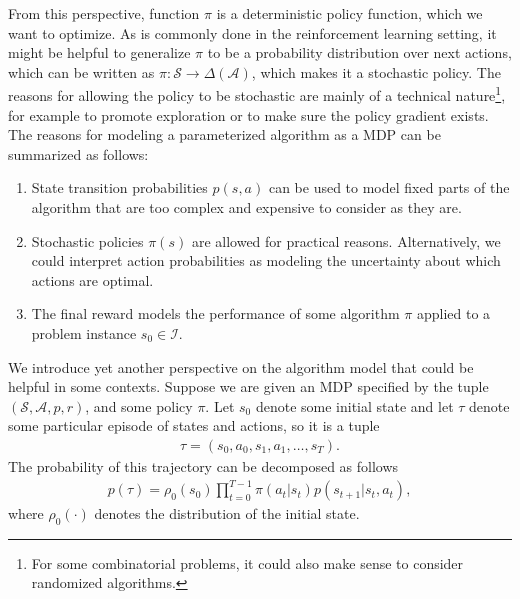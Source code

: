\documentclass[a4paper]{report}
\theoremstyle{definition}
\theoremstyle{plain}
\newcommand\note[1]{{\color{Navy}#1}}
\begin{document}
From this perspective, function $\pi$ is a deterministic policy function, which we
want to optimize.
As is commonly done in the reinforcement learning setting, it might be helpful
to generalize $\pi$ to be a probability distribution over next actions, which can
be written as $\pi : \mathcal{S} \rightarrow \Delta(\mathcal{A})$, which makes it a
stochastic policy.
%
The reasons for allowing the policy to be stochastic are mainly of a technical
nature\footnote{For some combinatorial problems, it could also make sense to
  consider randomized algorithms.}, for example to promote exploration or to
make sure the policy gradient exists.
%
The reasons for modeling a parameterized algorithm as a MDP can be summarized as
follows:

\begin{enumerate}[label=$\bullet$,leftmargin=2.5em,rightmargin=4em,midpenalty=5]
  \item State transition probabilities $p(s,a)$ can be used to model fixed parts
        of the algorithm that are too complex and expensive to consider as they
        are.

  \item Stochastic policies $\pi(s)$ are allowed for practical reasons.
        Alternatively, we could interpret action probabilities as modeling the
        uncertainty about which actions are optimal.

  \item The final reward models the performance of some algorithm $\pi$ applied
        to a problem instance $s_0 \in \mathcal{I}$.
\end{enumerate}

\note{
We introduce yet another perspective on the algorithm model that could
be helpful in some contexts.
%
Suppose we are given an MDP specified by the tuple
$(\mathcal{S}, \mathcal{A}, p, r)$, and some policy $\pi$.
%
Let $s_0$ denote some initial state and let $\tau$ denote some particular episode
of states and actions, so it is a tuple
\begin{align}
  \tau = (s_0, a_0, s_1, a_1, \dots, s_T) .
\end{align}
The probability of this trajectory can be decomposed as follows
\begin{align}
  \label{eq:7}
  p(\tau) = \rho_0(s_0) \prod_{t=0}^{T-1} \pi(a_t | s_t) p(s_{t+1} | s_t, a_t) ,
\end{align}
where $\rho_0(\cdot)$ denotes the distribution of the initial state.}

\end{document}
